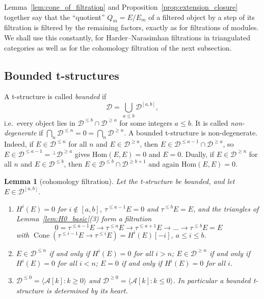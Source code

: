 \documentclass[12pt]{amsart}
\newtheorem{lemma}[theorem]{Lemma}
\newenvironment{remark}{{\textbf{Remark.}}}
\numberwithin{theorem}{section}
\theoremstyle{definition}
\newcommand{\calA}{\mathcal{A}}
\newcommand{\Hom}{\mathrm{Hom}}
\newcommand{\calD}{\mathcal{D}}
\newcommand{\Dle}[1]{\calD^{\leqslant #1}}
\newcommand{\Dge}[1]{\calD^{\geqslant #1}}
\newcommand{\Cone}{\operatorname{Cone}}
\newcommand{\Dint}[2]{\calD^{[#1, #2]}}
\begin{document}
	\begin{remark}
		Lemma~\ref{lem:cone_of_filtration} and Proposition~\ref{prop:extension_closure} together say that the ``quotient'' $Q_m = E / E_m$ of a filtered object by a step of its filtration is filtered by the remaining factors, exactly as for filtrations of modules.
		We shall use this constantly, for Harder--Narasimhan filtrations in triangulated categories as well as for the cohomology filtration of the next subsection.
	\end{remark}
	
	\subsection{Bounded t-structures}
	
	A t-structure is called \emph{bounded} if
	\[
	\calD = \bigcup_{a \leqslant b} \Dint{a}{b} ,
	\]
	i.e.\ every object lies in $\Dle{b} \cap \Dge{a}$ for some integers $a \leqslant b$.
	It is called \emph{non-degenerate} if $\bigcap_{n} \Dle{n} = 0 = \bigcap_{n} \Dge{n}$.
	A bounded t-structure is non-degenerate.
	Indeed, if $E \in \Dle{n}$ for all $n$ and $E \in \Dge{a}$, then $E \in \Dle{a-1} \cap \Dge{a}$, so $E \in \Dle{a-1} = {}^{\perp}\Dge{a}$ gives $\Hom(E, E) = 0$ and $E = 0$.
	Dually, if $E \in \Dge{n}$ for all $n$ and $E \in \Dle{b}$, then $E \in \Dle{b} \cap \Dge{b+1}$ and again $\Hom(E, E) = 0$.
	
	\begin{lemma}[cohomology filtration]
		\label{lem:cohomology_filtration}
		Let the t-structure be bounded, and let $E \in \Dint{a}{b}$.
		\begin{enumerate}
			\item $H^i(E) = 0$ for $i \notin [a, b]$, $\tau^{\leqslant a-1} E = 0$ and $\tau^{\leqslant b} E = E$, and the triangles of Lemma~\ref{lem:H0_basic}(3) form a filtration
			\[
			0 = \tau^{\leqslant a-1} E \to \tau^{\leqslant a} E \to \tau^{\leqslant a+1} E \to \ldots \to \tau^{\leqslant b} E = E
			\]
			with $\Cone(\tau^{\leqslant i-1} E \to \tau^{\leqslant i} E) = H^i(E)[-i]$, $a \leqslant i \leqslant b$.
			\item $E \in \Dle{n}$ if and only if $H^i(E) = 0$ for all $i > n$; $E \in \Dge{n}$ if and only if $H^i(E) = 0$ for all $i < n$; $E = 0$ if and only if $H^i(E) = 0$ for all $i$.
			\item $\Dle{0} = \langle \calA[k] : k \geqslant 0 \rangle$ and $\Dge{0} = \langle \calA[k] : k \leqslant 0 \rangle$.
			In particular a bounded t-structure is determined by its heart.
		\end{enumerate}
	\end{lemma}
	
\end{document}
